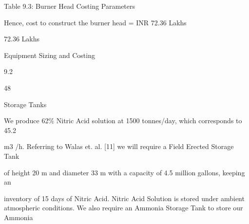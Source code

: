 \documentclass[a4paper,portrait,12pt]{article}
\begin{document}
\begin{flushleft}
Table 9.3: Burner Head Costing Parameters
\end{flushleft}





\begin{flushleft}
Hence, cost to construct the burner head = INR 72.36 Lakhs
\end{flushleft}





\begin{flushleft}
72.36 Lakhs
\end{flushleft}





\begin{flushleft}
\newpage
Equipment Sizing and Costing
\end{flushleft}





9.2





48





\begin{flushleft}
Storage Tanks
\end{flushleft}





\begin{flushleft}
We produce 62\% Nitric Acid solution at 1500 tonnes/day, which corresponds to 45.2
\end{flushleft}


\begin{flushleft}
m3 /h. Referring to Walas et. al. [11] we will require a Field Erected Storage Tank
\end{flushleft}


\begin{flushleft}
of height 20 m and diameter 33 m with a capacity of 4.5 million gallons, keeping an
\end{flushleft}


\begin{flushleft}
inventory of 15 days of Nitric Acid. Nitric Acid Solution is stored under ambient atmospheric conditions. We also require an Ammonia Storage Tank to store our Ammonia
\end{flushleft}
\end{document}
